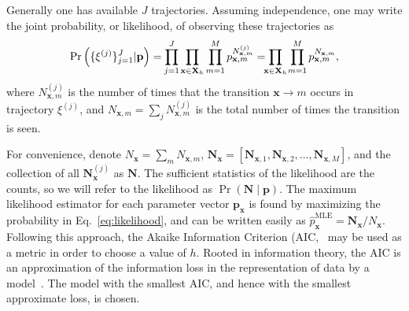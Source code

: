 \documentclass[prl,twocolumn,groupedaddress]{revtex4-1}
\newcommand{\bN}{\mathbf{N}}
\newcommand{\bx}{\mathbf{x}}
\newcommand{\bp}{\mathbf{p}}
\begin{document}
Generally one has available  $J$ trajectories. Assuming independence, one may write the joint probability, or likelihood, of observing these trajectories as
\begin{align}
\Pr\left(\{\xi^{(j)} \}_{j=1}^J \vert \bp\right) = \smashoperator{\prod_{j=1}^J} \prod_{\bx\in\mathbf{X}_h} \prod_{m=1}^M p_{\bx,m}^{N^{(j)}_{\bx,m}} = \smashoperator{\prod_{\bx\in\mathbf{X}_h} }\ \prod_{m=1}^M p_{\bx,m}^{N_{\bx,m}} ,
\label{eq:likelihood}
\end{align}
where $N^{(j)}_{\bx,m}$ is the number of times that the transition $\bx\to m$ occurs in trajectory $\xi^{(j)}$, and $N_{\bx,m} = \sum_j N^{(j)}_{\bx,m}$ is the total number of times the transition is seen.%

For convenience,  denote $N_{\bx} =\sum_{m}N_{\bx,m}$,  $\bN_{\bx}= [\bN_{\bx,1},\bN_{\bx,2},\ldots,\bN_{\bx,M}]$, and the collection of all $\bN^{(j)}_{\bx}$ as $\bN$. The sufficient statistics of the likelihood are the counts, so we will refer to the likelihood as $\Pr(\bN\mid\bp)$. The maximum likelihood estimator for each parameter vector $\bp_\bx$ is found by maximizing the probability in Eq.~\ref{eq:likelihood}, and can be written easily as
$\hat{p}^{\textrm{MLE}}_{\bx} = \mathbf{N}_{\bx} / N_{\bx}$. 
Following this approach, the Akaike Information Criterion (AIC,~\cite{akaike1974new,tong1975determination,katz1981some}  %
 may be used as a metric in order to choose a value of $h$.  Rooted in information theory, the AIC is an approximation of the information loss in the representation of data by a model~\cite{burnham2003model}. The model with the smallest AIC, and hence with the smallest approximate loss, is chosen.
\end{document}
